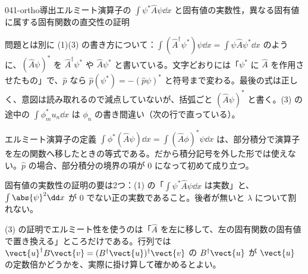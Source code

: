 \documentclass[uplatex,dvipdfmx,a4paper,11pt]{jsarticle}
\begin{document}
\begin{mondai}{041-ortho}{導出}{エルミート演算子の $\int\psi^{*}\hat{A}\psi\dd x$ と固有値の実数性，異なる固有値に属する固有関数の直交性の証明}
\begin{kotaeran}
  問題とは別に (1)(3) の書き方について：$\int(\hat{A}^{\dagger}\psi^{*})\psi\dd x=\int\psi\hat{A}\psi^{*}\dd x$ のように、$(\hat{A}\psi)^{*}$ を $\hat{A}^{\dagger}\psi^{*}$ や $\hat{A}\psi^{*}$ と書いている。文字どおりには「$\psi^{*}$ に $\hat{A}$ を作用させたもの」で、$\hat{p}$ なら $\hat{p}(\psi^{*})=-(\hat{p}\psi)^{*}$ と符号まで変わる。最後の式は正しく、意図は読み取れるので減点していないが、括弧ごと $(\hat{A}\psi)^{*}$ と書く。(3) の途中の $\int\phi_{m}^{*}u_{n}\dd x$ は $\phi_{n}$ の書き間違い（次の行で直っている）。
\end{kotaeran}
\begin{rikai}
  \item エルミート演算子の定義 $\int\phi^{*}(\hat{A}\psi)\dd x=\int(\hat{A}\phi)^{*}\psi\dd x$ は、部分積分で演算子を左の関数へ移したときの等式である。だから積分記号を外した形では使えない。$\hat{p}$ の場合、部分積分の境界の項が 0 になって初めて成り立つ。
  \item 固有値の実数性の証明の要は2つ：(1) の「$\int\psi^{*}\hat{A}\psi\dd x$ は実数」と、$\int\abs{\psi}^{2}\dd x$ が 0 でない正の実数であること。後者が無いと $\lambda$ について割れない。
  \item (3) の証明でエルミート性を使うのは「$\hat{A}$ を左に移して、左の固有関数の固有値で置き換える」ところだけである。行列では $\vect{u}^{\dagger}B\vect{v}=(B^{\dagger}\vect{u})^{\dagger}\vect{v}$ の $B^{\dagger}\vect{u}$ が $\vect{u}$ の定数倍かどうかを、実際に掛け算して確かめるとよい。
\end{rikai}
\end{mondai}
\end{document}
